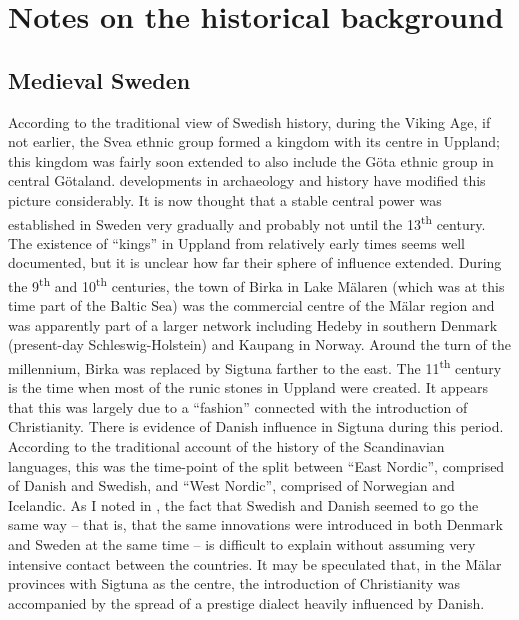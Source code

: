 
\section{Notes on the historical background}
\subsection{Medieval Sweden}

According to the traditional view of Swedish history, during the Viking Age, if not earlier, the Svea ethnic group formed a kingdom with its centre in Uppland; this kingdom was fairly soon extended to also include the Göta ethnic group in central Götaland. developments in archaeology and history have modified this picture considerably. It is now thought that a stable central power was established in Sweden very gradually and probably not until the 13\textsuperscript{th} century. The existence of “kings” in Uppland from relatively early times seems well documented, but it is unclear how far their sphere of influence extended. During the 9\textsuperscript{th} and 10\textsuperscript{th} centuries, the town of Birka in Lake Mälaren (which was at this time part of the Baltic Sea) was the commercial centre of the Mälar region and was apparently part of a larger network including Hedeby in southern Denmark (present-day Schleswig-Holstein) and Kaupang in Norway. Around the turn of the millennium, Birka was replaced by Sigtuna farther to the east. The 11\textsuperscript{th} century is the time when most of the runic stones in Uppland were created. It appears that this was largely due to a “fashion” connected with the introduction of Christianity. There is evidence of Danish influence in Sigtuna during this period. According to the traditional account of the history of the Scandinavian languages, this was the time-point of the split between “East Nordic”, comprised of Danish and Swedish, and “West Nordic”, comprised of Norwegian and Icelandic. As I noted in \citet{Dahl2001}, the fact that Swedish and Danish seemed to go the same way – that is, that the same innovations were introduced in both Denmark and Sweden at the same time – is difficult to explain without assuming very intensive contact between the countries. It may be speculated that, in the Mälar provinces with Sigtuna as the centre, the introduction of Christianity was accompanied by the spread of a prestige dialect heavily influenced by Danish. 

